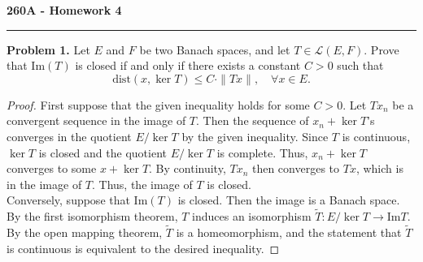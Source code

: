 \documentclass[11pt,letterpaper]{report}
\newcommand{\mcal}[1]{\mathcal{#1}}
\newcommand{\img}{\text{Im}}
\newcommand{\dist}{\text{dist}}
\begin{document}
\begin{center}
{\bf \Large 260A - Homework 4} %
\vspace{0.2cm}
\hrule
\end{center}

\noindent\textbf{Problem 1. }Let $E$ and $F$ be two Banach spaces, and let $T\in \mcal{L}(E,F)$. Prove that $\img(T)$ is closed if and only if there exists a constant $C>0$ such that
\[
\dist(x, \ker T)\leq C\cdot \|Tx\|,\quad \forall x\in E.
\]
\begin{proof}
	First suppose that the given inequality holds for some $C>0$. Let $Tx_n$ be a convergent sequence in the image of $T$. Then the sequence of $x_n+\ker T$'s converges in the quotient $E/\ker T$ by the given inequality. Since $T$ is continuous, $\ker T$ is closed and the quotient $E/\ker T$ is complete. Thus, $x_n+\ker T$ converges to some $x+\ker T$. By continuity, $Tx_n$ then converges to $Tx$, which is in the image of $T$. Thus, the image of $T$ is closed.\\

	\noindent Conversely, suppose that $\img(T)$ is closed. Then the image is a Banach space. By the first isomorphism theorem, $T$ induces an isomorphism $\tilde{T}: E/\ker T \to \img T$. By the open mapping theorem, $\tilde{T}$ is a homeomorphism, and the statement that $\tilde{T}$ is continuous is equivalent to the desired inequality.
\end{proof}
\end{document}
